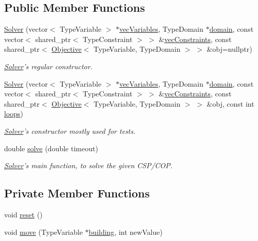 \subsection*{Public Member Functions}
\begin{DoxyCompactItemize}
\item 
\hyperlink{classghost_1_1Solver_aee74bbdf00494dc209d4909bf9fcb544}{Solver} (vector$<$ Type\-Variable $>$ $\ast$\hyperlink{classghost_1_1Solver_a2d033a454234b2277aabdcc4d89eaba2}{vec\-Variables}, Type\-Domain $\ast$\hyperlink{classghost_1_1Solver_ad9292e9219261ba8058fec05b453c0c9}{domain}, const vector$<$ shared\-\_\-ptr$<$ Type\-Constraint $>$ $>$ \&\hyperlink{classghost_1_1Solver_a170746edcfb777b12978444c2ab3962e}{vec\-Constraints}, const shared\-\_\-ptr$<$ \hyperlink{classghost_1_1Objective}{Objective}$<$ Type\-Variable, Type\-Domain $>$ $>$ \&obj=nullptr)
\begin{DoxyCompactList}\small\item\em \hyperlink{classghost_1_1Solver}{Solver}'s regular constructor. \end{DoxyCompactList}\item 
\hyperlink{classghost_1_1Solver_a512335329b22a91700bdfa7870f053e9}{Solver} (vector$<$ Type\-Variable $>$ $\ast$\hyperlink{classghost_1_1Solver_a2d033a454234b2277aabdcc4d89eaba2}{vec\-Variables}, Type\-Domain $\ast$\hyperlink{classghost_1_1Solver_ad9292e9219261ba8058fec05b453c0c9}{domain}, const vector$<$ shared\-\_\-ptr$<$ Type\-Constraint $>$ $>$ \&\hyperlink{classghost_1_1Solver_a170746edcfb777b12978444c2ab3962e}{vec\-Constraints}, const shared\-\_\-ptr$<$ \hyperlink{classghost_1_1Objective}{Objective}$<$ Type\-Variable, Type\-Domain $>$ $>$ \&obj, const int \hyperlink{classghost_1_1Solver_aa6a77e14862a9be467e6c6c76124b526}{loops})
\begin{DoxyCompactList}\small\item\em \hyperlink{classghost_1_1Solver}{Solver}'s constructor mostly used for tests. \end{DoxyCompactList}\item 
double \hyperlink{classghost_1_1Solver_a30dd2769fb30ac42d231d2c305dcdf13}{solve} (double timeout)
\begin{DoxyCompactList}\small\item\em \hyperlink{classghost_1_1Solver}{Solver}'s main function, to solve the given C\-S\-P/\-C\-O\-P. \end{DoxyCompactList}\end{DoxyCompactItemize}
\subsection*{Private Member Functions}
\begin{DoxyCompactItemize}
\item 
void \hyperlink{classghost_1_1Solver_a43db35b71a3e494ce208622cc45cbeb0}{reset} ()
\item 
void \hyperlink{classghost_1_1Solver_a58d9540a9700be0e953ebdcf0660920f}{move} (Type\-Variable $\ast$\hyperlink{namespaceghost_a7c0deb8266504feb7d025903f2b77693a4b7c211d9226050e5730e3b9a1b0b21a}{building}, int new\-Value)
\end{DoxyCompactItemize}
